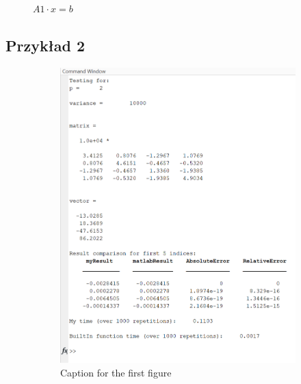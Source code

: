 \documentclass{article}
\begin{document}
\begin{figure}[hbt!]
        \caption{$A1 \cdot x = b$}
        \label{fig:example1}
    \end{figure}
    
    \newpage
    \subsection*{Przykład 2}
    \vspace{12pt}
    \begin{figure}[hbt!]
        \centering

        \begin{subfigure}{0.45\linewidth}
            \includegraphics[width=\linewidth]{img/fig2.png}
            \caption{Caption for the first figure}
        \end{subfigure}
        \hfill
        \begin{subfigure}{0.45\linewidth}

\end{subfigure}
\end{figure}
\end{document}
